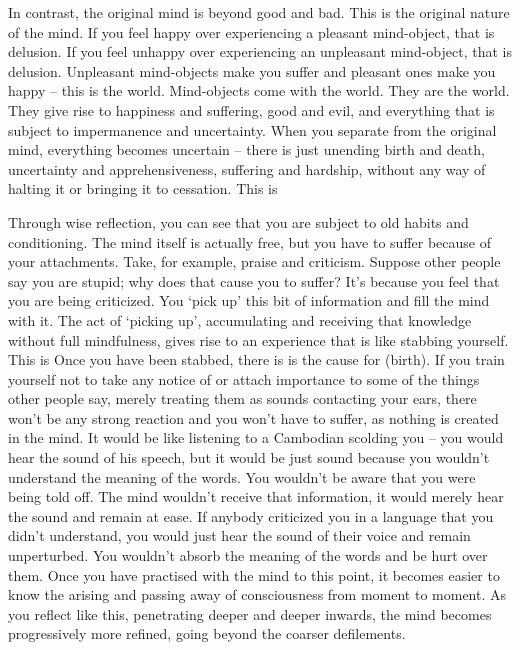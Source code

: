In contrast, the original mind is beyond good and bad. This is the original nature of the mind. If you feel happy over experiencing a pleasant mind-object, that is delusion. If you feel unhappy over experiencing an unpleasant mind-object, that is delusion. Unpleasant mind-objects make you suffer and pleasant ones make you happy -- this is the world. Mind-objects come with the world. They are the world. They give rise to happiness and suffering, good and evil, and everything that is subject to impermanence and uncertainty. When you separate from the original mind, everything becomes uncertain -- there is just unending birth and death, uncertainty and apprehensiveness, suffering and hardship, without any way of halting it or bringing it to cessation. This is 

Through wise reflection, you can see that you are subject to old habits and conditioning. The mind itself is actually free, but you have to suffer because of your attachments. Take, for example, praise and criticism. Suppose other people say you are stupid; why does that cause you to suffer? It's because you feel that you are being criticized. You `pick up' this bit of information and fill the mind with it. The act of `picking up', accumulating and receiving that knowledge without full mindfulness, gives rise to an experience that is like stabbing yourself. This is  Once you have been stabbed, there is   is the cause for  (birth). If you train yourself not to take any notice of or attach importance to some of the things other people say, merely treating them as sounds contacting your ears, there won't be any strong reaction and you won't have to suffer, as nothing is created in the mind. It would be like listening to a Cambodian scolding you -- you would hear the sound of his speech, but it would be just sound because you wouldn't understand the meaning of the words. You wouldn't be aware that you were being told off. The mind wouldn't receive that information, it would merely hear the sound and remain at ease. If anybody criticized you in a language that you didn't understand, you would just hear the sound of their voice and remain unperturbed. You wouldn't absorb the meaning of the words and be hurt over them. Once you have practised with the mind to this point, it becomes easier to know the arising and passing away of consciousness from moment to moment. As you reflect like this, penetrating deeper and deeper inwards, the mind becomes progressively more refined, going beyond the coarser defilements.

